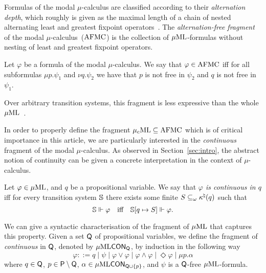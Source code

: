 \bigskip
Formulas of the modal $\mu$-calculus are classified according to their
\emph{alternation depth}, which roughly is given as the maximal length of
a chain of nested alternating least and greatest fixpoint operators~\cite{Niwinski86}.
The \emph{alternation-free fragment} of the modal $\mu$-calculus~($\mathrm{AFMC}$) is the collection of
$\mu\mathrm{ML}$-formulas without nesting of least and greatest fixpoint operators.

\begin{definition}
  Let $\varphi$ be a formula of the modal $\mu$-calculus. We say that $\varphi\in\mathrm{AFMC}$ iff for all subformulas $\mu p.\psi_1$ and $\nu q.\psi_2$ we have that $p$ is not free in $\psi_2$ and $q$ is not free in $\psi_1$.
\end{definition}

Over arbitrary transition systems, this fragment is
less expressive than the whole $\mu\mathrm{ML}$~\cite{Park79}. %

In order to properly define the fragment $\mu_{c}\textup{ML} \subseteq \mathrm{AFMC}$ which is of critical importance in this article, we are particularly interested in the \emph{continuous} fragment of the modal $\mu$-calculus. As observed in Section~\ref{sec:intro}, the abstract notion of continuity can be given a concrete interpretation in the context of $\mu$-calculus.
%
\begin{definition}
Let $\varphi \in \mu\mathrm{ML}$, and $q$ be a propositional variable. We say that \emph{$\varphi$ is continuous in $q$} iff for every transition system $\mathbb{S}$ there exists some finite $S \subseteq_\omega \kappa^\natural(q)$ such that
$$
\model \mmodels \varphi \quad\text{iff}\quad \model[q \mapsto S] \mmodels \varphi .
$$
\end{definition}

We can give a syntactic characterisation of the fragment of $\mu\mathrm{ML}$ that captures this property. Given a set $\mathsf{Q}$ of propositional variables, we define the fragment of \MC \emph{continuous} in $\mathsf{Q}$, denoted by $\mu\mathrm{ML}\mathsf{CON}_{\mathsf{Q}}$, by induction in the following way
\begin{equation*}
   \varphi ::= q
   \mid \psi
   \mid \varphi \lor \varphi
   \mid \varphi \land \varphi
   \mid \Diamond \varphi
   \mid \mu p.\alpha
\end{equation*}
%
where $q \in \mathsf{Q}$, $p \in \mathsf{P} \setminus \mathsf{Q}$, $\alpha \in \mu\mathrm{ML}\mathsf{CON}_{\mathsf{Q}\cup\{p\}}$, and $\psi$ is a $\mathsf{Q}$-free $\mu\mathrm{ML}$-formula.

